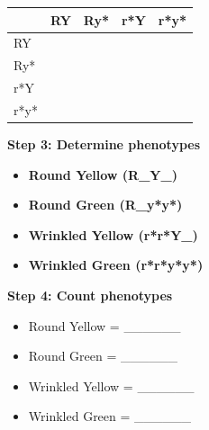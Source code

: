 \documentclass[
  letterpaper,
  DIV=11,
  numbers=noendperiod]{scrreprt}
\newcounter{none} %
\begin{document}
{\def\LTcaptype{none} %
\begin{longtable}[]{@{}
  >{\raggedright\arraybackslash}p{}
  >{\centering\arraybackslash}p{}
  >{\centering\arraybackslash}p{}
  >{\centering\arraybackslash}p{}
  >{\centering\arraybackslash}p{}@{}}
\toprule\noalign{}
\begin{minipage}[b]{\linewidth}\raggedright
\end{minipage} & \begin{minipage}[b]{\linewidth}\centering
RY
\end{minipage} & \begin{minipage}[b]{\linewidth}\centering
Ry*
\end{minipage} & \begin{minipage}[b]{\linewidth}\centering
r*Y
\end{minipage} & \begin{minipage}[b]{\linewidth}\centering
r*y*
\end{minipage} \\
\midrule\noalign{}
\endhead
\bottomrule\noalign{}
\endlastfoot
RY & & & & \\
Ry* & & & & \\
r*Y & & & & \\
r*y* & & & & \\
\end{longtable}
}

\textbf{Step 3: Determine phenotypes}

\begin{itemize}
\item
  \textbf{Round Yellow (R\_Y\_)}
\item
  \textbf{Round Green (R\_y*y*)}
\item
  \textbf{Wrinkled Yellow (r*r*Y\_)}
\item
  \textbf{Wrinkled Green (r*r*y*y*)}
\end{itemize}

\textbf{Step 4: Count phenotypes}

\begin{itemize}
\item
  Round Yellow = \_\_\_\_\_\_
\item
  Round Green = \_\_\_\_\_\_
\item
  Wrinkled Yellow = \_\_\_\_\_\_
\item
  Wrinkled Green = \_\_\_\_\_\_
\end{itemize}
\end{document}
